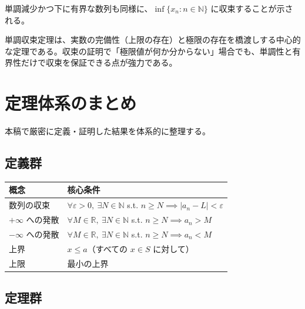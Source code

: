 \documentclass[11pt,a4paper]{jsarticle}
\theoremstyle{definition}
\newcommand{\N}{\mathbb{N}}
\newcommand{\eps}{\varepsilon}
\begin{document}
\begin{notebox}[双対定理]
単調減少かつ下に有界な数列も同様に、$\inf\{x_n : n \in \N\}$ に収束することが示される。
\end{notebox}

\begin{notebox}[本定理の重要性]
単調収束定理は、実数の完備性（上限の存在）と極限の存在を橋渡しする中心的な定理である。収束の証明で「極限値が何か分からない」場合でも、単調性と有界性だけで収束を保証できる点が強力である。
\end{notebox}

\newpage

\section{定理体系のまとめ}\label{sec:summary}

本稿で厳密に定義・証明した結果を体系的に整理する。

\subsection{定義群}

\begin{center}
\begin{tabular}{@{}ll@{}}
\toprule
\textbf{概念} & \textbf{核心条件} \\
\midrule
数列の収束 & $\forall \eps > 0,\ \exists N \in \N$ s.t. $n \geq N \implies |a_n - L| < \eps$ \\
$+\infty$ への発散 & $\forall M\in \mathbb{R},\ \exists N \in \N$ s.t. $n \geq N \implies a_n > M$ \\
$-\infty$ への発散 & $\forall M \in \mathbb{R},\ \exists N \in \N$ s.t. $n \geq N \implies a_n < M$ \\
上界 & $x \leq a$（すべての $x \in S$ に対して） \\
上限 & 最小の上界 \\
\bottomrule
\end{tabular}
\end{center}

\subsection{定理群}
\end{document}
